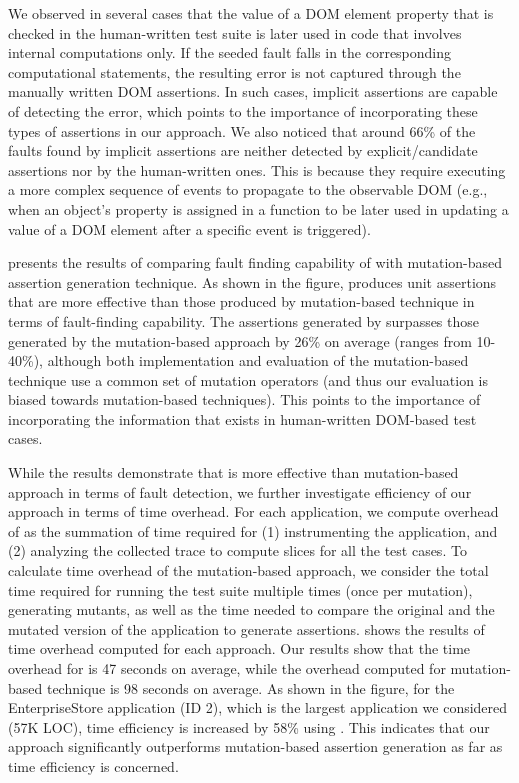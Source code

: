 We observed in several cases that the value of a DOM element property that is checked in the human-written test suite is later used in \javascript code that involves internal computations only. If the seeded fault falls in the corresponding computational statements, the resulting error is not captured through the manually written DOM assertions. In such cases, implicit assertions are capable of detecting the error, which points to the importance of incorporating these types of assertions in our approach. We also noticed that around 66\% of the faults found by implicit assertions are neither detected by explicit/candidate assertions nor by the human-written ones. This is because they require executing a more complex sequence of events to propagate to the observable DOM (e.g., when an object's property is assigned in a function to be later used in updating a value of a DOM element after a specific event is triggered). 

 presents the results of comparing fault finding capability of \tool with mutation-based assertion generation technique. As shown in the figure, \tool produces unit assertions that are more effective than those produced by mutation-based technique in terms of fault-finding capability. The assertions generated by \tool surpasses those generated by the mutation-based approach by 26\% on average (ranges from 10-40\%), although both implementation and evaluation of the mutation-based technique use a common set of mutation operators (and thus our evaluation is biased towards mutation-based techniques).
This points to the importance of incorporating the information that exists in human-written DOM-based test cases.       

While the results demonstrate that \tool is more effective than mutation-based approach in terms of fault detection, we further investigate efficiency of our approach in terms of time overhead. 
For each application, we compute overhead of \tool as the summation of time required for (1) instrumenting the application, and (2) analyzing the collected trace to compute \javascript slices for all the test cases. To calculate time overhead of the mutation-based approach, we consider the total time required for running the test suite multiple times (once per mutation), generating mutants, as well as the time needed to compare the original and the mutated version of the application to generate assertions.  shows the results of time overhead computed for each approach.    
Our results show that the time overhead for \tool is 47 seconds on average, while the overhead computed for mutation-based technique is 98 seconds on average. As shown in the figure, for the EnterpriseStore application (ID 2), which is the largest application we considered (57K LOC), time efficiency is increased by 58\% using \tool. This indicates that our approach significantly outperforms mutation-based assertion generation as far as time efficiency is concerned. 
